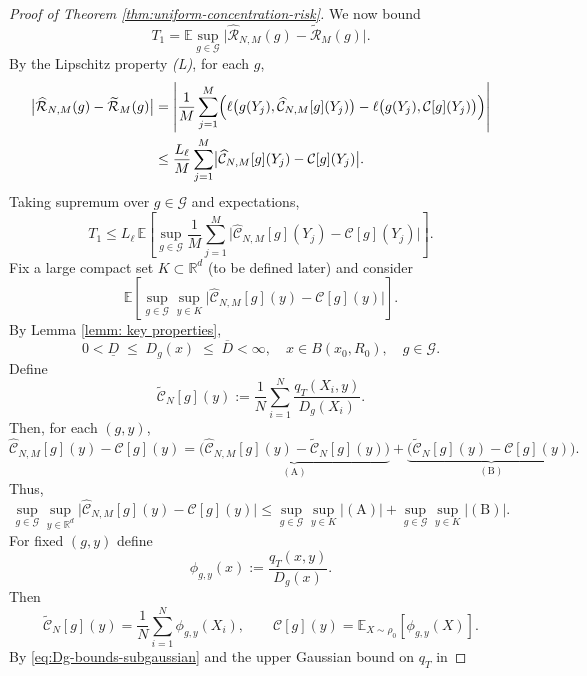 \documentclass[11pt]{article}
\theoremstyle{remark}
\numberwithin{equation}{section}
\newcommand{\R}{\mathbb{R}}
\begin{document}
\begin{proof}[Proof of Theorem \ref{thm:uniform-concentration-risk}]
We now bound
\[
  T_1
  =
  \mathbb{E}
  \sup_{g\in\mathcal{G}}
    \bigl|
      \widehat{\mathcal{R}}_{N,M}(g) - \widetilde{\mathcal{R}}_M(g)
    \bigr|.
\]
By the Lipschitz property \emph{(L)}, for each $g$,
\begin{align*}
  \bigl|
    \widehat{\mathcal{R}}_{N,M}(g) - \widetilde{\mathcal{R}}_M(g)
  \bigr|
  &=
  \left|
    \frac{1}{M}\sum_{j=1}^M
      \Bigl(
        \ell\bigl(g(Y_j),\widehat{\mathcal{C}}_{N,M}[g](Y_j)\bigr)
        -
        \ell\bigl(g(Y_j),\mathcal{C}[g](Y_j)\bigr)
      \Bigr)
  \right|
  \\
  &\le
  \frac{L_\ell}{M}\sum_{j=1}^M
    \bigl|
      \widehat{\mathcal{C}}_{N,M}[g](Y_j) - \mathcal{C}[g](Y_j)
    \bigr|.
\end{align*}
Taking supremum over $g\in\mathcal{G}$ and expectations,
\[
  T_1
  \le
  L_\ell\,
  \mathbb{E}
  \left[
    \sup_{g\in\mathcal{G}}
      \frac{1}{M}\sum_{j=1}^M
        \bigl|
          \widehat{\mathcal{C}}_{N,M}[g](Y_j) - \mathcal{C}[g](Y_j)
        \bigr|
  \right].
\]
Fix a large compact set $K\subset\mathbb{R}^d$ (to be defined later) and consider 
\[
  \mathbb{E}
  \left[
    \sup_{g\in\mathcal{G}}\sup_{y\in K}
      \bigl|
        \widehat{\mathcal{C}}_{N,M}[g](y) - \mathcal{C}[g](y)
      \bigr|
  \right].
\]
By Lemma \ref{lemm: key properties}, 
\begin{equation}\label{eq:Dg-bounds-subgaussian}
  0 < \underline{D}
  \;\le\;
  D_g(x)
  \;\le\;
  \overline{D}
  < \infty,
  \quad x\in B(x_0, R_0),\quad g\in\mathcal{G}.
\end{equation}
Define
\[
  \widetilde{\mathcal{C}}_{N}[g](y)
  :=
  \frac{1}{N}\sum_{i=1}^N
     \frac{q_T(X_i,y)}{D_g(X_i)}.
\]
Then, for each $(g,y)$,
\[
  \widehat{\mathcal{C}}_{N,M}[g](y) - \mathcal{C}[g](y)
  =
  \underbrace{
    \bigl(
      \widehat{\mathcal{C}}_{N,M}[g](y) 
      - \widetilde{\mathcal{C}}_{N}[g](y)
    \bigr)
  }_{(\mathrm{A})}
  +
  \underbrace{
    \bigl(
      \widetilde{\mathcal{C}}_{N}[g](y) - \mathcal{C}[g](y)
    \bigr)
  }_{(\mathrm{B})}.
\]
Thus,
\[
  \sup_{g\in\mathcal{G}}\sup_{y\in \R^d}
    \bigl|
      \widehat{\mathcal{C}}_{N,M}[g](y) - \mathcal{C}[g](y)
    \bigr|
  \le
  \sup_{g\in\mathcal{G}}\sup_{y\in K}|(\mathrm{A})|
  +
  \sup_{g\in\mathcal{G}}\sup_{y\in K}|(\mathrm{B})|.
\]
For fixed $(g,y)$ define
\[
  \phi_{g,y}(x)
  :=
  \frac{q_T(x,y)}{D_g(x)}.
\]
Then
\[
  \widetilde{\mathcal{C}}_{N}[g](y)
  =
  \frac{1}{N}\sum_{i=1}^N \phi_{g,y}(X_i),
  \qquad
  \mathcal{C}[g](y)
  =
  \mathbb{E}_{X\sim\rho_0}[\phi_{g,y}(X)].
\]
 By \eqref{eq:Dg-bounds-subgaussian} and the upper Gaussian bound on $q_T$ in

\end{proof}
\end{document}
